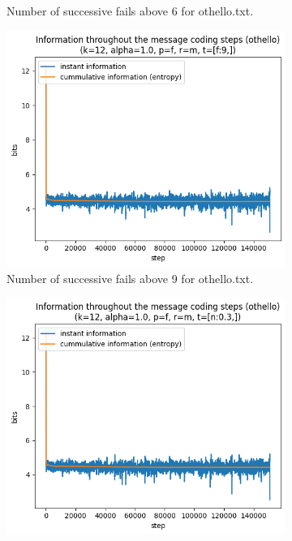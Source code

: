 \documentclass{article}
\begin{document}
\begin{figure}
\begin{subfigure}[b]{0.3\textwidth}
\begin{center}
        \end{center}
        \caption{Number of successive fails above 6 for othello.txt.}
        \label{fig:othello-results-threshold-f-6}
    \end{subfigure}
    \hfill
    \begin{subfigure}[b]{0.3\textwidth}
        \begin{center}
            \includegraphics[width=1.0\linewidth]{../scripts/images/othello_12_1.0_f_m_[f:9,].png}
        \end{center}
        \caption{Number of successive fails above 9 for othello.txt.}
        \label{fig:othello-results-threshold-f-9}
    \end{subfigure}
    \begin{subfigure}[b]{0.3\textwidth}
        \begin{center}
            \includegraphics[width=1.0\linewidth]{../scripts/images/othello_12_1.0_f_m_[n:0.3,].png}

\end{center}
\end{subfigure}
\end{figure}
\end{document}
